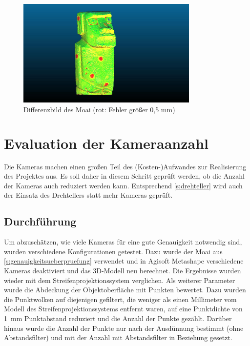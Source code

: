 \documentclass[./00PhotoBox.tex]{subfiles}
\begin{document}
\begin{figure}
    \centering
    \includegraphics[width=0.8\textwidth]{img/moai_fehler_drehteller.jpg}
    \caption{Differenzbild des Moai (rot: Fehler größer 0,5 mm)}
    \label{img:drehteller_moai_fehler}
\end{figure}



\section{Evaluation der Kameraanzahl}
\label{s:kameraanzahl}
Die Kameras machen einen großen Teil des (Kosten-)Aufwandes zur Realisierung des Projektes aus. Es soll daher in diesem Schritt geprüft werden, ob die Anzahl der Kameras auch reduziert werden kann. Entsprechend \autoref{s:drehteller} wird auch der Einsatz des Drehtellers statt mehr Kameras geprüft.

\subsection{Durchführung}
Um abzuschätzen, wie viele Kameras für eine gute Genauigkeit notwendig sind, wurden verschiedene Konfigurationen getestet. Dazu wurde der Moai aus \autoref{s:genauigkeitsueberpruefung} verwendet und in Agisoft Metashape verschiedene Kameras deaktiviert und das 3D-Modell neu berechnet. Die Ergebnisse wurden wieder mit dem Streifenprojektionssystem verglichen. Als weiterer Parameter wurde die Abdeckung der Objektoberfläche mit Punkten bewertet. Dazu wurden die Punktwolken auf diejenigen gefiltert, die weniger als einen Millimeter vom Modell des Streifenprojektionssystems entfernt waren, auf eine Punktdichte von 1~mm Punktabstand reduziert und die Anzahl der Punkte gezählt. Darüber hinaus wurde die Anzahl der Punkte nur nach der Ausdünnung bestimmt (ohne Abstandsfilter) und mit der Anzahl mit Abstandsfilter in Beziehung gesetzt.
\end{document}

